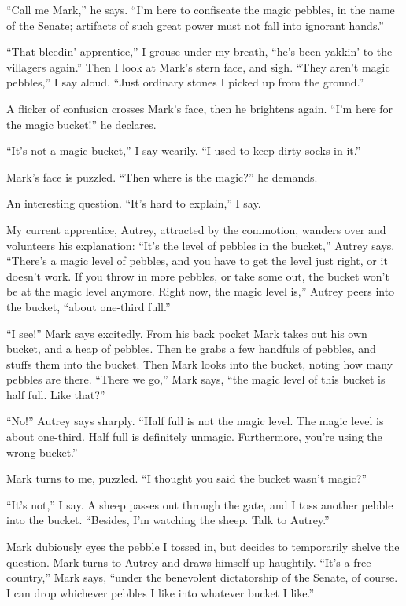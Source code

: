 {
 ``Call me Mark,'' he says.
``I'm here to confiscate the magic
pebbles, in the name of the Senate; artifacts of such great power must
not fall into ignorant hands.''}

{
 ``That bleedin'
apprentice,'' I grouse under my breath,
``he's been yakkin' to
the villagers again.'' Then I look at
Mark's stern face, and sigh. ``They
aren't magic pebbles,'' I say aloud.
``Just ordinary stones I picked up from the
ground.''}

{
 A flicker of confusion crosses Mark's face, then
he brightens again. ``I'm here for the
magic bucket!'' he declares.}

{
 ``It's not a magic
bucket,'' I say wearily. ``I used to
keep dirty socks in it.''}

{
 Mark's face is puzzled. ``Then
where is the magic?'' he demands.}

{
 An interesting question. ``It's
hard to explain,'' I say.}

{
 My current apprentice, Autrey, attracted by the commotion, wanders
over and volunteers his explanation:
``It's the level of pebbles in the
bucket,'' Autrey says.
``There's a magic level of pebbles,
and you have to get the level just right, or it doesn't
work. If you throw in more pebbles, or take some out, the bucket
won't be at the magic level anymore. Right now, the
magic level is,'' Autrey peers into the bucket,
``about one-third full.''}

{
 ``I see!'' Mark says excitedly.
From his back pocket Mark takes out his own bucket, and a heap of
pebbles. Then he grabs a few handfuls of pebbles, and stuffs them into
the bucket. Then Mark looks into the bucket, noting how many pebbles
are there. ``There we go,'' Mark
says, ``the magic level of this bucket is half full.
Like that?''}

{
 ``No!'' Autrey says sharply.
``Half full is not the magic level. The magic level is
about one-third. Half full is definitely unmagic. Furthermore,
you're using the wrong bucket.''}

{
 Mark turns to me, puzzled. ``I thought you said
the bucket wasn't magic?''}

{
 ``It's not,'' I
say. A sheep passes out through the gate, and I toss another pebble
into the bucket. ``Besides, I'm
watching the sheep. Talk to Autrey.''}

{
 Mark dubiously eyes the pebble I tossed in, but decides to
temporarily shelve the question. Mark turns to Autrey and draws himself
up haughtily. ``It's a free
country,'' Mark says, ``under the
benevolent dictatorship of the Senate, of course. I can drop whichever
pebbles I like into whatever bucket I like.''}

